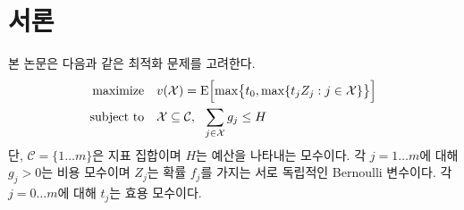 \documentclass[11pt]{article} %
\newif\ifen
\theoremstyle{definition}
\newtheorem{definition}{Definition}
\theoremstyle{definition}
\newtheorem{definition}{정의}
\begin{document}
\pagebreak
\ifen \section{Introduction}  \else \section{서론} \fi
\ifen This paper considers the following optimization problem:
\else 본 논문은 다음과 같은 최적화 문제를 고려한다.\fi
\begin{align} \label{headlineproblem}
\begin{split}
\text{maximize}\quad & v(\mathcal{X}) =  \operatorname{E}\Bigl[\max\bigr\{t_0,
\max\{t_j Z_j : j \in \mathcal{X}\}\bigr\}\Bigr] \\
\text{subject to}\quad & \mathcal{X} \subseteq \mathcal{C}, ~~\sum_{j\in \mathcal{X}} g_j \leq H
\end{split}
\end{align}
\ifen Here $\mathcal{C} = \{ 1 \dots m\}$ is an index set; $H > 0$ is a budget parameter; for $j = 1 \dots m$, $g_j > 0$ is a cost parameter and $Z_j$ is a random, independent Bernoulli variable with probability $f_j$; and for $j = 0\dots m$, $t_j$ is a utility parameter. 
\else 단,  $\mathcal{C} = \{ 1 \dots m\}$은 지표 집합이며 $H$는 예산을 나타내는 모수이다. 각 $j = 1 \dots m$에 대해 $g_j > 0$는 비용 모수이며 $Z_j$는 확률 $f_j$를 가지는 서로 독립적인 Bernoulli 변수이다. 각 $j = 0 \dots m$에 대해 $t_j$는 효용 모수이다. \fi
\end{document}
